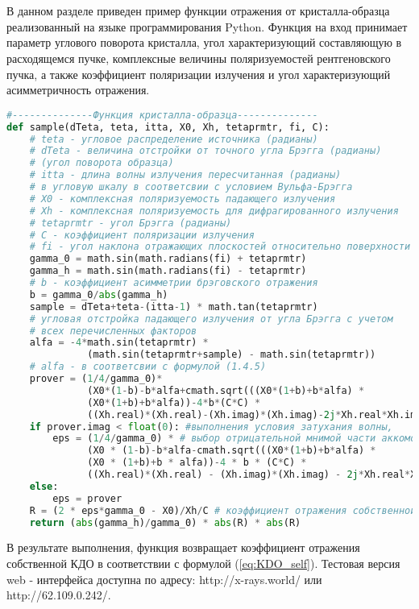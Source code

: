 \newpage
  \section{ }%
  \label{sec:sample_functions}

В данном разделе приведен пример функции отражения от кристалла-образца
реализованный на
языке программирования Python. Функция на вход принимает
параметр углового поворота кристалла, угол характеризующий
составляющую в расходящемся пучке, комплексные величины поляризуемостей
 рентгеновского пучка, а также коэффициент поляризации излучения и угол
 характеризующий асимметричность отражения.

{\scriptsize
\begin{lstlisting}[language=Python]
#--------------Функция кристалла-образца--------------
def sample(dTeta, teta, itta, X0, Xh, tetaprmtr, fi, C):
    # teta - угловое распределение источника (радианы)
    # dTeta - величина отстройки от точного угла Брэгга (радианы)
    # (угол поворота образца)
    # itta - длина волны излучения пересчитанная (радианы)
    # в угловую шкалу в соответсвии с условием Вульфа-Брэгга
    # X0 - комплексная поляризуемость падающего излучения
    # Xh - комплексная поляризуемость для дифрагированного излучения
    # tetaprmtr - угол Брэгга (радианы)
    # C - коэффициент поляризации излучения
    # fi - угол наклона отражающих плоскостей относительно поверхности (градусы)
    gamma_0 = math.sin(math.radians(fi) + tetaprmtr)
    gamma_h = math.sin(math.radians(fi) - tetaprmtr)
    # b - коэффициент асимметрии брэговского отражения
    b = gamma_0/abs(gamma_h)
    sample = dTeta+teta-(itta-1) * math.tan(tetaprmtr)
    # угловая отстройка падающего излучения от угла Брэгга с учетом
    # всех перечисленных факторов
    alfa = -4*math.sin(tetaprmtr) *
              (math.sin(tetaprmtr+sample) - math.sin(tetaprmtr))
    # alfa - в соответсвии с формулой (1.4.5)
    prover = (1/4/gamma_0)*
              (X0*(1-b)-b*alfa+cmath.sqrt(((X0*(1+b)+b*alfa) *
              (X0*(1+b)+b*alfa))-4*b*(C*C) *
              ((Xh.real)*(Xh.real)-(Xh.imag)*(Xh.imag)-2j*Xh.real*Xh.imag)))
    if prover.imag < float(0): #выполнения условия затухания волны,
        eps = (1/4/gamma_0) * # выбор отрицательной мнимой части аккомодации
              (X0 * (1-b)-b*alfa-cmath.sqrt(((X0*(1+b)+b*alfa) *
              (X0 * (1+b)+b * alfa))-4 * b * (C*C) *
              ((Xh.real)*(Xh.real) - (Xh.imag)*(Xh.imag) - 2j*Xh.real*Xh.imag)))
    else:
        eps = prover
    R = (2 * eps*gamma_0 - X0)/Xh/C # коэффициент отражения собственной КДО
    return (abs(gamma_h)/gamma_0) * abs(R) * abs(R)
\end{lstlisting}
}
В результате выполнения, функция возвращает коэффициент отражения собственной КДО в
соответствии с формулой (\ref{eq:KDO_self}). Тестовая версия web - интерфейса
доступна по адресу: http://x-rays.world/ или http://62.109.0.242/.
